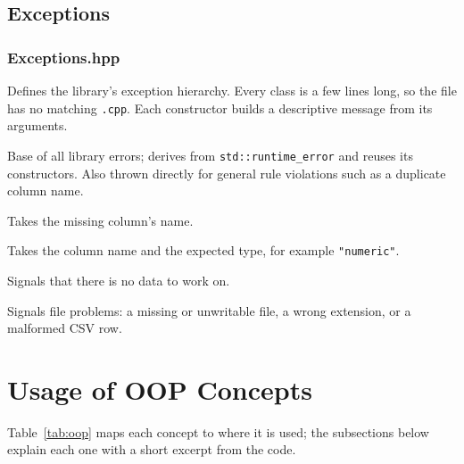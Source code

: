 \documentclass[11pt,a4paper]{article}
\newcommand{\code}[1]{\texttt{#1}}
\begin{document}
\subsection{Exceptions}

\subsubsection*{Exceptions.hpp}

Defines the library's exception hierarchy. Every class is a few lines long, so the file has no
matching \code{.cpp}. Each constructor builds a descriptive message from its arguments.

\begin{description}[noitemsep,leftmargin=1.5em]
  \item[\code{DataException}] Base of all library errors; derives from \code{std::runtime\_error}
    and reuses its constructors. Also thrown directly for general rule violations such as a
    duplicate column name.
  \item[\code{ColumnNotFoundException}] Takes the missing column's name.
  \item[\code{TypeMismatchException}] Takes the column name and the expected type, for example
    \code{"numeric"}.
  \item[\code{EmptyDataException}] Signals that there is no data to work on.
  \item[\code{FileException}] Signals file problems: a missing or unwritable file, a wrong
    extension, or a malformed CSV row.
\end{description}

\section{Usage of OOP Concepts}

Table~\ref{tab:oop} maps each concept to where it is used; the subsections below explain each one
with a short excerpt from the code.
\end{document}
